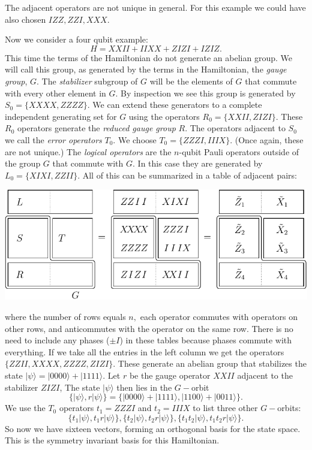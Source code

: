 \documentclass[a4paper,onecolumn,11pt,unpublished]{quantumarticle}
\def\Ham{H}
\def\Stab{S}
\newcommand{\ket}[1]{|{#1}\rangle}
\newcommand\doexample[1]{\vskip 5pt \noindent {\bf \underline{Example #1.}\ }}
\newcommand\tombstone{\qedsymbol\vskip 5pt}
\newcounter{numitem}
\newcommand{\numitem}[1]{\refstepcounter{numitem}\thenumitem\label{#1}}
\begin{document}
The adjacent operators are not unique in general. 
For this example we could have also chosen $IZZ, ZZI, XXX.$
\tombstone

\doexample{\numitem{Ex3}}
Now we consider a four qubit example:
$$
    \Ham = XXII + IIXX + ZIZI + IZIZ.
$$
This time the terms of the Hamiltonian do not generate 
an abelian group.
We will call this group, as generated by the terms in the Hamiltonian,
the \emph{gauge group}, $G$.
The \emph{stabilizer} subgroup of $G$ will be the elements of $G$
that commute with every other element in $G.$
By inspection we see this group is generated by $\Stab_0=\{XXXX, ZZZZ\}.$
We can extend these generators to a complete independent generating
set for $G$ using the operators  $R_0=\{XXII, ZIZI\}.$
These $R_0$ operators generate the \emph{reduced gauge group} $R.$
The operators adjacent to $\Stab_0$ we
call the \emph{error operators} $T_0$. 
We choose $T_0 = \{ZZZI, IIIX\}.$
(Once again, these are not unique.)
The \emph{logical operators} are the $n$-qubit 
Pauli operators outside of the group
$G$ that commute with $G.$
In this case they are generated by $L_0 = \{XIXI, ZZII\}.$
All of this can be summarized in a table of adjacent pairs:
\begin{center}
\includegraphics[]{pic-gauge4.pdf}
\end{center}
where the number of rows equals $n,$ 
each operator commutes with operators on other rows,
and anticommutes with the operator on the same row. 
There is no need to include any phases ($\pm I$) in these tables
because phases commute with everything.
If we take all the entries in the left column
we get the operators 
$\{ ZZII, XXXX, ZZZZ, ZIZI \}.$ 
These generate an abelian group 
that stabilizes the
state $\ket{\psi} = \ket{0000}+\ket{1111}.$
Let $r$ be the gauge operator $XXII$ adjacent to the 
stabilizer $ZIZI$,
The state $\ket{\psi}$ then lies in the $G-$orbit 
$$
\{\ket{\psi}, r\ket{\psi}\} = \{\ket{0000}+\ket{1111}, \ket{1100}+\ket{0011}\}.
$$
We use the $T_0$ operators $t_1=ZZZI$ and $t_2=IIIX$
to list three other $G-$orbits:
$$
\{t_1 \ket{\psi}, t_1 r\ket{\psi}\}, 
\{t_2 \ket{\psi}, t_2 r\ket{\psi}\}, 
\{t_1 t_2 \ket{\psi}, t_1 t_2 r\ket{\psi}\}.
$$
So now we have sixteen vectors, forming an orthogonal basis for the state space.
This is the symmetry invariant basis for this Hamiltonian.
\end{document}
